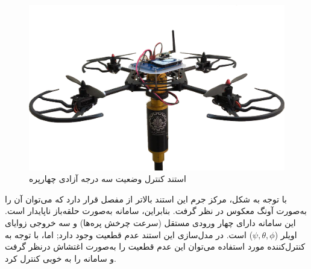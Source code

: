 \begin{figure}[H]\label{LabQuad}
	\includegraphics[width=13cm]{../Figures/introduction/3DOFQuad.png}
	\centering
	\caption{استند کنترل وضعیت سه درجه آزادی چهارپره 
	\cite{Iranlabexpo}}
\end{figure}
با توجه به شکل، مرکز جرم این استند بالاتر از مفصل قرار دارد که می‌توان آن را به‌صورت آونگ معکوس در نظر گرفت. بنابراین، سامانه به‌صورت حلقه‌باز ناپایدار است. این سامانه دارای چهار ورودی مستقل (سرعت چرخش پره‌ها) و سه خروجی زوایای اویلر ($\psi, \theta, \phi$) است. در مدل‌سازی این استند عدم قطعیت وجود دارد; اما، با توجه به کنترل‌کننده مورد استفاده می‌توان این عدم قطعیت را به‌صورت اغتشاش درنظر گرفت و سامانه را به خوبی کنترل کرد. 


%
